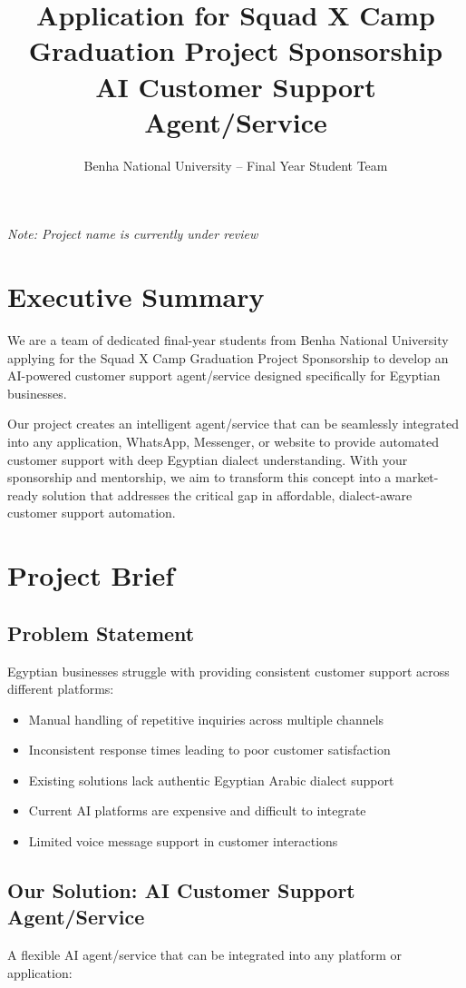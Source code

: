 \documentclass[12pt,a4paper]{article}
\title{Application for Squad X Camp Graduation Project Sponsorship \\ 
\large AI Customer Support Agent/Service}
\author{Benha National University – Final Year Student Team}
\date{}
\begin{document}
\maketitle

\textit{Note: Project name is currently under review}

\section*{Executive Summary}
We are a team of dedicated final-year students from Benha National University applying for the Squad X Camp Graduation Project Sponsorship to develop an AI-powered customer support agent/service designed specifically for Egyptian businesses.

Our project creates an intelligent agent/service that can be seamlessly integrated into any application, WhatsApp, Messenger, or website to provide automated customer support with deep Egyptian dialect understanding. With your sponsorship and mentorship, we aim to transform this concept into a market-ready solution that addresses the critical gap in affordable, dialect-aware customer support automation.

\section*{Project Brief}

\subsection*{Problem Statement}
Egyptian businesses struggle with providing consistent customer support across different platforms:
\begin{itemize}
    \item Manual handling of repetitive inquiries across multiple channels
    \item Inconsistent response times leading to poor customer satisfaction
    \item Existing solutions lack authentic Egyptian Arabic dialect support
    \item Current AI platforms are expensive and difficult to integrate
    \item Limited voice message support in customer interactions
\end{itemize}

\subsection*{Our Solution: AI Customer Support Agent/Service}
A flexible AI agent/service that can be integrated into any platform or application:
\end{document}
